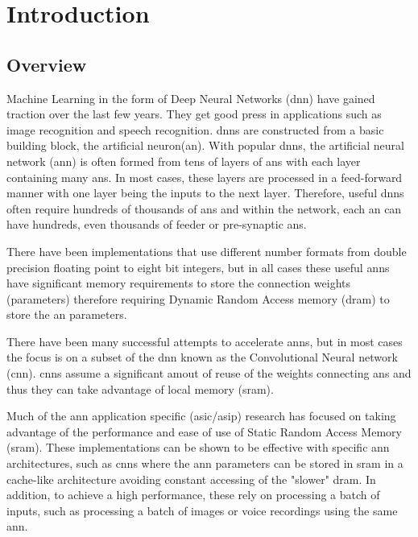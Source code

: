 
\chapter{Introduction}
\label{sec:chap-one}


\section{Overview}
\label{sec:overview}

Machine Learning in the form of Deep Neural Networks (\ac{dnn}) have gained traction over the last few years.
They get good press in applications such as image recognition and speech recognition.
\ac{dnn}s are constructed from a basic building block, the artificial neuron(\ac{an}).
With popular \ac{dnn}s, the artificial neural network (\ac{ann}) is often formed from tens of layers of \ac{an}s with each layer containing many \ac{an}s.
In most cases, these layers are processed in a feed-forward manner with one layer being the inputs to the next layer.
Therefore, useful \ac{dnn}s often require hundreds of thousands of \ac{an}s and within the network, each \ac{an} can have hundreds, even thousands of feeder or pre-synaptic \ac{an}s.

There have been implementations that use different number formats from double precision floating point to eight bit integers, but in all cases these useful \ac{ann}s have significant
memory requirements to store the connection weights (parameters) therefore requiring Dynamic Random Access memory (\ac{dram}) to store the \ac{an} parameters.

There have been many successful attempts to accelerate \ac{ann}s, but in most cases the focus is on a subset of the \ac{dnn} known as the Convolutional Neural network (\ac{cnn}).
\ac{cnn}s assume a significant amout of reuse of the weights connecting \ac{an}s and thus they can take advantage of local memory (\ac{sram}).

Much of the \ac{ann} application specific (\ac{asic}/\ac{asip}) research has focused on taking advantage of the performance and ease of use of Static Random Access Memory (\ac{sram}).
These implementations can be shown to be effective with specific \ac{ann} architectures, such as \ac{cnn}s where the \ac{ann} parameters can be stored in \ac{sram} in a cache-like architecture avoiding constant accessing of the "slower" \ac{dram}.
In addition, to achieve a high performance, these rely on processing a batch of inputs, such as processing a batch of images or voice recordings using the same \ac{ann}.

